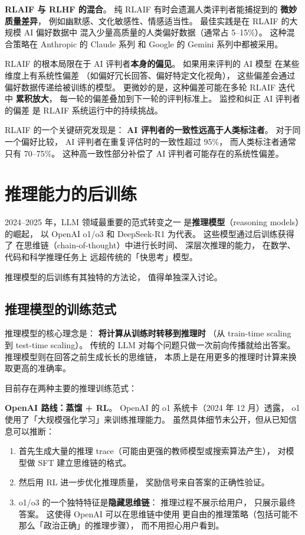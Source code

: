 \textbf{RLAIF 与 RLHF 的混合}。
纯 RLAIF 有时会遗漏人类评判者能捕捉到的
\textbf{微妙质量差异}，
例如幽默感、文化敏感性、情感适当性。
最佳实践是在 RLAIF 的大规模 AI 偏好数据中
混入少量高质量的人类偏好数据（通常占 5--15\%）。
这种混合策略在 Anthropic 的 Claude 系列
和 Google 的 Gemini 系列中都被采用。

\begin{warnbox}
RLAIF 的根本局限在于 AI 评判者\textbf{本身的偏见}。
如果用来评判的 AI 模型
在某些维度上有系统性偏差
（如偏好冗长回答、偏好特定文化视角），
这些偏差会通过偏好数据传递给被训练的模型。
更微妙的是，这种偏差可能在多轮 RLAIF 迭代中
\textbf{累积放大}，
每一轮的偏差叠加到下一轮的评判标准上。
监控和纠正 AI 评判者的偏差
是 RLAIF 系统运行中的持续挑战。
\end{warnbox}

RLAIF 的一个关键研究发现是：
\textbf{AI 评判者的一致性远高于人类标注者}。
对于同一个偏好比较，
AI 评判者在重复评估时的一致性超过 95\%，
而人类标注者通常只有 70--75\%。
这种高一致性部分补偿了
AI 评判者可能存在的系统性偏差。

\section{推理能力的后训练}
\label{sec:reasoning-post-training}

2024--2025 年，LLM 领域最重要的范式转变之一
是\textbf{推理模型}（reasoning models）的崛起，
以 OpenAI o1/o3 和 DeepSeek-R1 为代表。
这些模型通过后训练获得了
在思维链（chain-of-thought）中进行长时间、
深层次推理的能力，
在数学、代码和科学推理任务上
远超传统的「快思考」模型。

推理模型的后训练有其独特的方法论，
值得单独深入讨论。

\subsection{推理模型的训练范式}

推理模型的核心理念是：
\textbf{将计算从训练时转移到推理时}
（从 train-time scaling 到 test-time scaling）。
传统的 LLM 对每个问题只做一次前向传播就给出答案。
推理模型则在回答之前生成长长的思维链，
本质上是在用更多的推理时计算来换取更高的准确率。

目前存在两种主要的推理训练范式：

\textbf{OpenAI 路线：蒸馏 + RL}。
OpenAI 的 o1 系统卡（2024 年 12 月）透露，
o1 使用了「大规模强化学习」来训练推理能力。
虽然具体细节未公开，但从已知信息可以推断：
\begin{enumerate}[noitemsep]
  \item 首先生成大量的推理 trace（可能由更强的教师模型或搜索算法产生），
        对模型做 SFT 建立思维链的格式。
  \item 然后用 RL 进一步优化推理质量，
        奖励信号来自答案的正确性验证。
  \item o1/o3 的一个独特特征是\textbf{隐藏思维链}：
        推理过程不展示给用户，
        只展示最终答案。
        这使得 OpenAI 可以在思维链中使用
        更自由的推理策略（包括可能不那么「政治正确」的推理步骤），
        而不用担心用户看到。
\end{enumerate}

